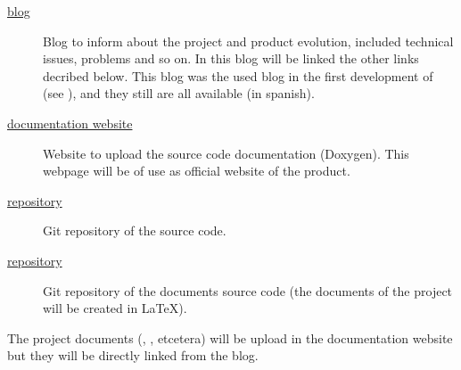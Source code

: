 \documentclass[twocolumn]{article}
\begin{document}
\begin{description}
  \item[\href{http://freealgview.blogspot.com}{\fav blog}] Blog to
    inform about the project and product evolution, included technical
    issues, problems and so on. In this blog will be linked the other
    links decribed below. This blog was the used blog in the first
    development of \fav (see ), and they still
    are all available (in spanish).
  \item[\href{http://peregring-lk.github.com/FreeAlgView}{\fav
      documentation website}] Website to upload the \fav source code
    documentation (Doxygen). This webpage will be of use as official
    website of the product.
  \item[\href{https://github.com/Peregring-lk/FreeAlgView}{\fav
      repository}] Git repository of the \fav source code.
  \item[\href{https://github.com/Peregring-lk/FreeAlgView-project-doc}{\favp
  repository}]  Git repository of the \favp documents source code (the
    documents of the project will be created in \LaTeX).
\end{description}

The project documents (\chart, \plan, etcetera) will be upload in
the \fav documentation website but they will be directly linked from
the blog.

\end{document}
